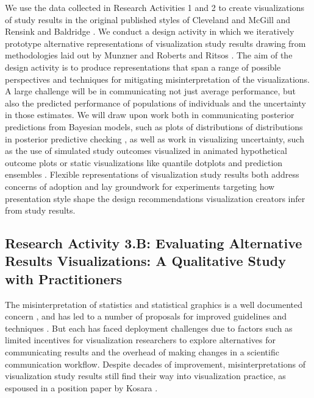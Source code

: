 \documentclass[11pt]{article}
\begin{document}
We use the data collected in Research Activities 1 and 2 to create visualizations of study results in the original published styles of Cleveland and McGill \cite{cleveland1984graphical} and Rensink and Baldridge \cite{rensink2010perception}.
We conduct a design activity in which we iteratively prototype  alternative representations of visualization study results drawing from methodologies laid out by Munzner \etal \cite{munzner2009nested, sedlmair2012design} and Roberts and Ritsos \cite{roberts2016sketching}.
The aim of the design activity is to produce representations that span a range of possible perspectives and techniques for mitigating misinterpretation of the visualizations.
A large challenge will be in communicating not just average performance, but also the predicted performance of populations of individuals and the uncertainty in those estimates.
We will draw upon work both in communicating posterior predictions from Bayesian models, such as plots of distributions of distributions in posterior predictive checking \cite{gabry2017visualization}, as well as work in visualizing uncertainty, such as the use of simulated study outcomes visualized in animated hypothetical outcome plots \cite{hullman2015hops} or static visualizations like quantile dotplots \cite{kay2016bus} and prediction ensembles \cite{liu2016hurricane}.
Flexible representations of visualization study results both address concerns of adoption and lay groundwork for experiments targeting how presentation style shape the design recommendations visualization creators infer from study results.

\subsection{Research Activity 3.B: Evaluating Alternative Results Visualizations: A Qualitative Study with Practitioners}
\figrathree
The misinterpretation of statistics and statistical graphics is a well documented concern \cite{correllblack, valdez2017priming, micallef2012assessing, hoekstra2014ci}, and has led to a number of proposals for improved guidelines and techniques \eg \cite{ruchikachorn2015learning, correll2014error, ottley2016improving, hullman2015hops}.
But each has faced deployment challenges due to factors such as limited incentives for visualization researchers to explore alternatives for communicating results and the overhead of making changes in a scientific communication workflow.
Despite decades of improvement, misinterpretations of visualization study results still find their way into visualization practice, as espoused in a position paper by Kosara \cite{kosara2016empire}.
\end{document}
